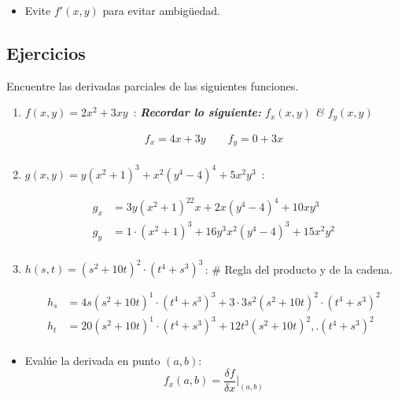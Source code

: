 \begin{itemize}
\begin{itemize}
            \item Evite $f'(x,y)$ para evitar ambigüedad.
        \end{itemize}
\end{itemize}



\subsection{Ejercicios}
Encuentre las derivadas parciales de las siguientes funciones.
\begin{enumerate}
    \item $f(x,y)=2x^2+3xy\,$ : \emph{\textbf{Recordar lo siguiente: }$f_x(x,y)$ \& $f_y(x,y)$} 
        \begin{center}
           \begin{align*}               
                f_x = 4x+3y \quad \quad f_y=0+3x \\ 
           \end{align*}
        \end{center}
    
    \item $g(x,y)=y(x^2+1)^3+x^2(y^4-4)^4+5x^2y^3\,$ :
        \begin{center}
           \begin{align*}
                g_x&=3y(x^2+1)^22x+2x(y^4-4)^4+10xy^3 \\ 
                g_y&=1 \cdot (x^2+1)^3 + 16y^3x^2(y^4-4)^3+15x^2y^2 \\ 
           \end{align*}
        \end{center}        
    
    \item $h(s,t)=(s^2+10t)^2\cdot(t^4+s^3)^3\,$: \# Regla del producto y de la cadena.
        \begin{center}
           \begin{align*}
               h_s &= 4s(s^2+10t)^1\cdot(t^4+s^3)^3+3\cdot3s^2(s^2+10t)^2\cdot(t^4+s^3)^2 \\ 
               h_t&= 20(s^2+10t)^1\cdot(t^4+s^3)^3+12t^3(s^2+10t)^2,.
               (t^4+s^3)^2 \\  
           \end{align*}
        \end{center}
\end{enumerate}
\begin{itemize}[label=\#]
    \item Evalúe la derivada en punto $(a,b)$:            
        \[
            f_x(a,b)=\frac{\delta f}{\delta x} \Big|_{(a,b)}^{} 
        \]
\end{itemize}

